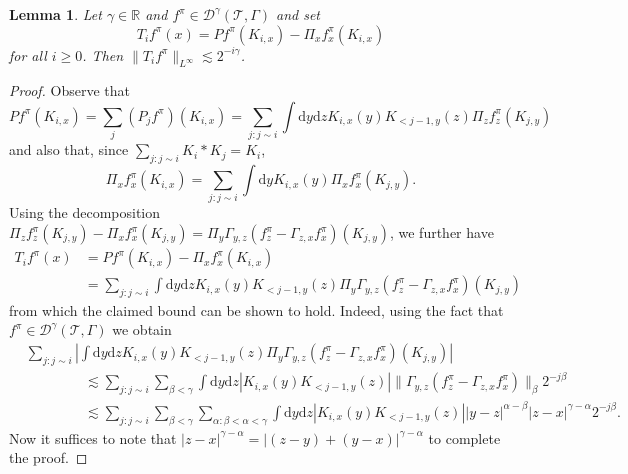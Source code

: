\documentclass[a4paper,11pt]{article}
\newcommand{\mathd}{\mathrm{d}}
\newtheorem{lemma}[theorem]{Lemma}
\theoremstyle{remark}
\newcommand{\R}{\mathbb{R}}
\begin{document}
\begin{lemma}\label{lem:Ti-bound}
  Let $\gamma \in \R$ and $f^\pi \in \mathcal{D}^{\gamma} ( \mathcal{T}, \Gamma )$ and set
  \[ T_{i} f^{\pi} ( x ) =P f^{\pi} ( K_{i,x} ) - \Pi_{x} f^{\pi}_{x} (
     K_{i,x} ) \]
  for all $i \geqslant 0$. Then $\| T_{i} f^{\pi} \|_{L^{\infty}} \lesssim 2^{-i \gamma}$.
\end{lemma}

\begin{proof}
  Observe that
  \[ 
     P f^{\pi} ( K_{i,x} ) = \sum_{j} ( P_{j} f^{\pi} ) ( K_{i,x} ) = \sum_{j: j \sim i} \int \mathd y \mathd zK_{i,x} ( y ) K_{< j-1,y} ( z ) \Pi_{z} f^{\pi}_{z} ( K_{j,y} )
  \]
  and also that, since $\sum_{j:j \sim i} K_{i} \ast K_{j} =K_{i}$,
  \[
     \Pi_{x} f^{\pi}_{x} ( K_{i,x} ) = \sum_{j: j \sim i} \int \mathd y K_{i,x} ( y ) \Pi_{x} f^{\pi}_{x} ( K_{j,y} ).
  \]
  Using the decomposition $\Pi_{z} f^{\pi}_{z} ( K_{j,y} ) - \Pi_{x}
  f^{\pi}_{x} ( K_{j,y} ) = \Pi_{y} \Gamma_{y,z} ( f^{\pi}_{z} - \Gamma_{z,x} f^{\pi}_{x} )
  ( K_{j,y} )$, we further have
  \begin{align*}
     T_{i} f^{\pi} ( x ) & =P f^{\pi} ( K_{i,x} ) - \Pi_{x} f^{\pi}_{x} (K_{i,x} ) \\
     & = \sum_{j:j \sim i} \int \mathd y \mathd zK_{i,x} ( y ) K_{< j-1,y} ( z ) \Pi_{y} \Gamma_{y,z} ( f^{\pi}_{z} - \Gamma_{z,x} f^{\pi}_{x} ) ( K_{j,y} )
  \end{align*}
  from which the claimed bound can be shown to hold. Indeed, using the fact that $f^{\pi} \in \mathcal{D}^{\gamma}( \mathcal{T}, \Gamma )$ we obtain
  \begin{align*}
     &\sum_{j:j \sim i} \left\lvert \int \mathd y \mathd z K_{i,x} ( y ) K_{< j-1,y} ( z ) \Pi_{y} \Gamma_{y,z} ( f^{\pi}_{z} - \Gamma_{z,x}f^{\pi}_{x} ) ( K_{j,y} ) \right\rvert \\
     &\hspace{50pt} \lesssim \sum_{j:j \sim i} \sum_{\beta<\gamma} \int \mathd y \mathd z \left\lvert K_{i,x} ( y ) K_{< j-1,y} ( z ) \right\rvert \|\Gamma_{y,z} ( f^{\pi}_{z} - \Gamma_{z,x}f^{\pi}_{x} )\|_\beta 2^{-j\beta} \\
     &\hspace{50pt} \lesssim \sum_{j:j \sim i} \sum_{\beta<\gamma} \sum_{\alpha: \beta<\alpha<\gamma} \int \mathd y \mathd z \left\lvert K_{i,x} ( y ) K_{< j-1,y} ( z ) \right\rvert |y-z|^{\alpha-\beta} |z-x|^{\gamma-\alpha} 2^{-j\beta}.
  \end{align*}
  Now it suffices to note that $|z-x|^{\gamma-\alpha} = |(z-y)+ (y-x)|^{\gamma-\alpha}$ to complete the proof.
\end{proof}
\end{document}
